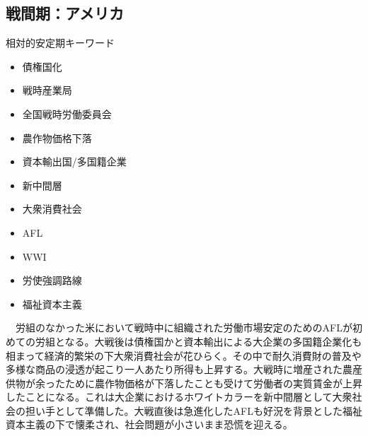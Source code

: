 \documentclass{jsarticle}
\begin{document}
\subsection{戦間期：アメリカ}
相対的安定期キーワード
\begin{itemize}
\item 債権国化
\item 戦時産業局
\item 全国戦時労働委員会
\item 農作物価格下落
\item 資本輸出国/多国籍企業
\item 新中間層
\item 大衆消費社会
\item AFL
\item WWI
\item 労使強調路線
\item 福祉資本主義
\end{itemize}
　労組のなかった米において戦時中に組織された労働市場安定のためのAFLが初めての労組となる。大戦後は債権国かと資本輸出による大企業の多国籍企業化も相まって経済的繁栄の下大衆消費社会が花ひらく。その中で耐久消費財の普及や多様な商品の浸透が起こり一人あたり所得も上昇する。大戦時に増産された農産供物が余ったために農作物価格が下落したことも受けて労働者の実質賃金が上昇したことになる。これは大企業におけるホワイトカラーを新中間層として大衆社会の担い手として準備した。大戦直後は急進化したAFLも好況を背景とした福祉資本主義の下で懐柔され、社会問題が小さいまま恐慌を迎える。
\end{document}
